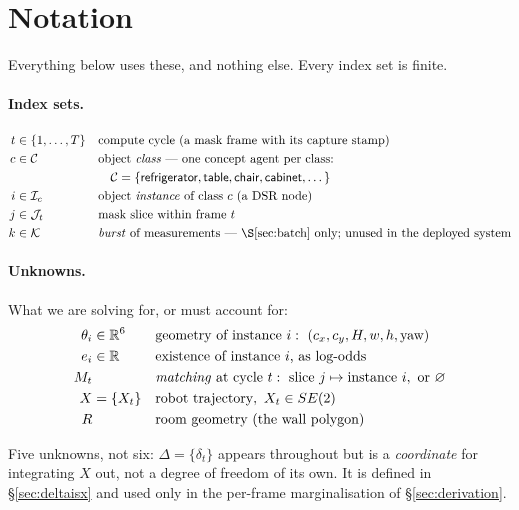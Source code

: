 \documentclass[11pt,a4paper]{report}
\newcommand{\R}{\mathbb{R}}
\theoremstyle{definition}   %
\begin{document}
\section{Notation}
\label{sec:notation}

Everything below uses these, and nothing else. Every index set is finite.

\paragraph{Index sets.}
\begin{align*}
t &\in \{1,\dots,T\}    && \text{compute cycle (a mask frame with its capture stamp)}\\
c &\in \mathcal{C}       && \text{object \emph{class} — one concept agent per class:}\\
  &                      && \quad \mathcal{C}=\{\textsf{refrigerator},\textsf{table},\textsf{chair},\textsf{cabinet},\dots\}\\
i &\in \mathcal{I}_c     && \text{object \emph{instance} of class }c\text{ (a DSR node)}\\
j &\in \mathcal{J}_t     && \text{mask slice within frame }t\\
k &\in \mathcal{K}       && \text{\emph{burst} of measurements — \S\ref{sec:batch} only; unused in the deployed system}
\end{align*}

\paragraph{Unknowns.} What we are solving for, or must account for:
\begin{align*}
\theta_i &\in \R^{6}   && \text{geometry of instance }i:\ (c_x,c_y,H,w,h,\text{yaw})\\
e_i      &\in \R       && \text{existence of instance }i\text{, as log-odds}\\
M_t      &             && \text{\emph{matching} at cycle }t:\ \text{slice } j \mapsto \text{instance } i,\ \text{or } \varnothing\\
X        &=\{X_t\}     && \text{robot trajectory},\ X_t\in SE(2)\\
R        &             && \text{room geometry (the wall polygon)}
\end{align*}

\noindent
Five unknowns, not six: $\Delta=\{\delta_t\}$ appears throughout but is a \emph{coordinate} for
integrating $X$ out, not a degree of freedom of its own. It is defined in \S\ref{sec:deltaisx}
and used only in the per-frame marginalisation of \S\ref{sec:derivation}.
\end{document}
